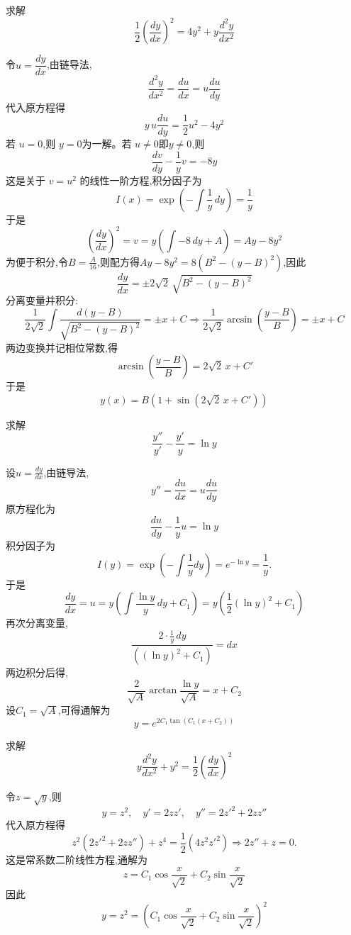 \begin{questions}
    \question 求解
    \[
    \frac{1}{2}\left(\frac{dy}{dx}\right)^2 = 4y^2 + y\frac{d^2y}{dx^2}
    \]
    \begin{solution}
        令$u=\dfrac{dy}{dx}$,由链导法,
        \[
        \frac{d^2y}{dx^2}=\frac{du}{dx}=u\frac{du}{dy}
        \]
        代入原方程得
        \[
        y\,u\frac{du}{dy} = \frac{1}{2}u^2 - 4y^2
        \]
        若 $u=0$,则 $y=0$为一解。若 $u\neq0$即$y\neq0$,则
        \[
        \frac{dv}{dy} - \frac{1}{y}v = -8y
        \]
        这是关于 $v=u^2$ 的线性一阶方程,积分因子为 
        \[
        I(x)=\exp{\left(-\int \frac{1}{y}\,dy\right)}=\frac{1}{y}
        \]
        于是
        \[
        \left(\frac{dy}{dx}\right)^2=v=y\left(\int -8 \,dy+A\right)=A y - 8y^2
        \]
        为便于积分,令$B=\frac{A}{16}$,则配方得$A y - 8y^2 = 8\left(B^2 - (y-B)^2\right)$,因此
        \[
        \frac{dy}{dx} = \pm 2\sqrt{2}\,\sqrt{B^2-(y-B)^2}
        \]
        分离变量并积分:
        \[
        \frac{1}{2\sqrt{2}}\int \frac{d(y-B)}{\sqrt{B^2-(y-B)^2}} = \pm x + C \Rightarrow \frac{1}{2\sqrt{2}}\arcsin\left(\frac{y-B}{B}\right) = \pm x + C
        \]
        两边变换并记相位常数,得
        \[
        \arcsin\left(\frac{y-B}{B}\right) = 2\sqrt{2}\,x + C'
        \]
        于是
        \[
        y(x) = B\left(1 + \sin\left(2\sqrt{2}\,x + C'\right)\right)
        \]
    \end{solution}

    \question 求解
    \[
    \frac{y''}{y'} - \frac{y'}{y} = \ln y
    \]
    \begin{solution}
        设$u = \frac{dy}{dx}$,由链导法,
        \[
        y'' = \frac{du}{dx} = u \frac{du}{dy}
        \]
        原方程化为
        \[
        \frac{du}{dy} - \frac{1}{y} u = \ln y
        \]
        积分因子为
        \[
        I(y) = \exp\left(-\int \frac{1}{y} dy \right) = e^{-\ln y} = \frac{1}{y}.
        \]
        于是
        \[
        \frac{dy}{dx} = u = y \left(\int \frac{\ln y}{y} \,dy+C_1\right)=y\left( \frac{1}{2} (\ln y)^2 + C_1 \right)
        \]
        再次分离变量,
        \[
        \frac{2\cdot \frac{1}{y}\,dy}{ \left((\ln y)^2 + C_1 \right)} = dx
        \]
        两边积分后得,
        \[
        \frac{2}{\sqrt{A}} \arctan\frac{\ln y}{\sqrt{A}} = x + C_2
        \]
        设$C_1=\sqrt{A}$,可得通解为
        \[
        y = e^{\displaystyle 2C_1 \tan(C_1(x+C_2))}
        \]
    \end{solution}

    \question 求解
    \[
    y\frac{d^2y}{dx^2}+y^2=\frac12\left(\frac{dy}{dx}\right)^2
    \]
    \begin{solution}
        令$z=\sqrt{y}$,则
        \[
        y=z^2,\quad y'=2zz',\quad y''=2{z'}^2+2zz''
        \]
        代入原方程得
        \[
        z^2(2{z'}^2+2zz'')+z^4=\frac12(4z^2{z'}^2) \Rightarrow 2z''+z=0.
        \]
        这是常系数二阶线性方程,通解为
        \[
        z=C_1\cos\frac{x}{\sqrt2}+C_2\sin\frac{x}{\sqrt2}
        \]
        因此
        \[
        y=z^2=\left(C_1\cos\frac{x}{\sqrt2}+C_2\sin\frac{x}{\sqrt2}\right)^{2}
        \]
    \end{solution}


\end{questions}
